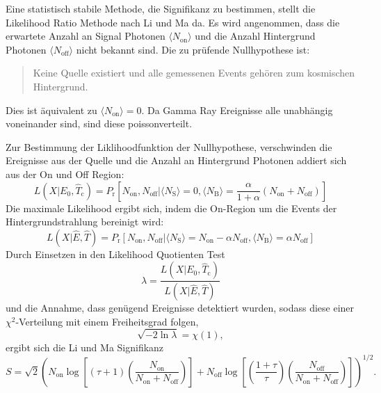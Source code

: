 Eine statistisch stabile Methode, die Signifikanz zu bestimmen, stellt die
Likelihood Ratio Methode nach Li und Ma da.
Es wird angenommen, dass die erwartete Anzahl an Signal
Photonen $\langle N_\text{on} \rangle$ und die Anzahl Hintergrund Photonen
$\langle N_\text{off} \rangle$ nicht bekannt sind.
Die zu prüfende Nullhypothese ist:
\begin{quote}
	Keine Quelle existiert und
	alle gemessenen Events gehören zum kosmischen Hintergrund.
\end{quote}
Dies ist äquivalent zu $\langle N_\text{on} \rangle=0$.
Da Gamma Ray Ereignisse alle unabhängig voneinander sind,
sind diese poissonverteilt.

Zur Bestimmung der Liklihoodfunktion der Nullhypothese,
verschwinden die
Ereignisse aus der Quelle und die Anzahl an Hintergrund Photonen addiert sich
aus der On und Off Region:
\begin{equation}
	L(X|E_0, \hat{T}_\text{c})= P_\text{r} \left[
		N_\text{on}, N_\text{off} |
		\langle N_\text{S} \rangle = 0,
		\langle N_\text{B} \rangle = \frac{\alpha}{1 + \alpha} (N_\text{on} +
			N_\text{off})
	\right]
\end{equation}
Die maximale Likelihood ergibt sich, indem die On-Region
um die Events der Hintergrundstrahlung bereinigt wird:
\begin{equation}
	L(X|\hat{E}, \hat{T})= P_\text{r} \left[
		N_\text{on}, N_\text{off} |
		\langle N_\text{S} \rangle = N_\text{on} - \alpha N_\text{off},
		\langle N_\text{B} \rangle = \alpha N_\text{off}
	\right]
\end{equation}
Durch Einsetzen in den Likelihood Quotienten Test
\begin{equation}
	\lambda = \frac{L(X|E_0, \hat{T}_\text{c})}{L(X|\hat{E}, \hat{T})}
\end{equation}
und die Annahme, dass genügend Ereignisse detektiert wurden, sodass diese einer
$\chi^2$-Verteilung mit einem Freiheitsgrad folgen,
\begin{equation}
	\sqrt{- 2 \ln \lambda} = \chi(1),
\end{equation}
ergibt sich die Li und Ma Signifikanz
\begin{equation}
  S = \sqrt{2} {\left(
      N_\text{on} \log \left[
        (\tau + 1) \left(
          \frac{N_\text{on}}{N_\text{on} + N_\text{off}}
        \right)
      \right]
      + N_\text{off} \log \left[
        \left( \frac{1 + \tau}{\tau} \right) \left(
          \frac{N_\text{off}}{N_\text{on} + N_\text{off}}
        \right)
      \right]
  \right)} ^ {1/2}.
\end{equation}

